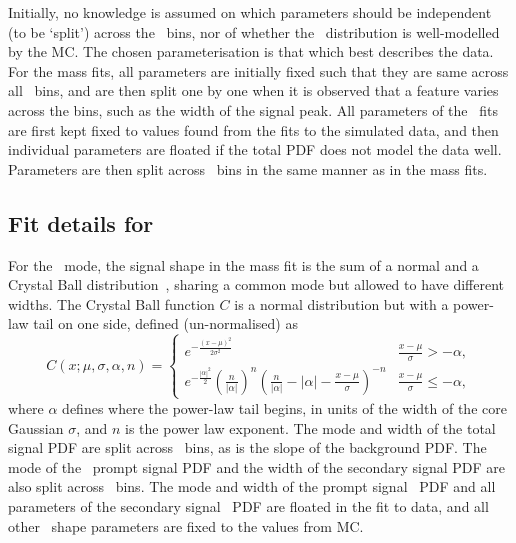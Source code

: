 Initially, no knowledge is assumed on which parameters should be independent 
(to be `split') across the \pTy\ bins, nor of whether the \lnipchisq\ 
distribution is well-modelled by the \ac{MC}.
The chosen parameterisation is that which best describes the data.
For the mass fits, all parameters are initially fixed such that they are same 
across all \pTy\ bins, and are then split one by one when it is observed that a 
feature varies across the bins, such as the width of the signal peak.
All parameters of the \lnipchisq\ fits are first kept fixed to values found 
from the fits to the simulated data, and then individual parameters are floated 
if the total PDF does not model the data well.
Parameters are then split across \pTy\ bins in the same manner as in the mass 
fits.

\subsection{Fit details for \PDzero}
\label{chap:prod:fitting:details:D0ToKpi}

For the \DzToKpi\ mode, the signal shape in the mass fit is the sum of a normal 
and a Crystal Ball distribution~\cite{Skwarnicki:1986xj}, sharing a common mode 
but allowed to have different widths.
The Crystal Ball function $C$ is a normal distribution but with a power-law 
tail on one side, defined (un-normalised) as
\begin{equation}
  C(x; \mu, \sigma, \alpha, n) = \begin{cases}
    e^{-\frac{{(x - \mu)}^{2}}{2\sigma^{2}}}                          & \frac{x - \mu}{\sigma} > -\alpha, \\
    e^{-\frac{|\alpha|^{2}}{2}}
      {\left(\frac{n}{|\alpha|}\right)}^{n}
      {\left(\frac{n}{|\alpha|} - |\alpha| - \frac{x - \mu}{\sigma}\right)}^{-n} & \frac{x - \mu}{\sigma} \leq -\alpha,
  \end{cases}
  \label{eqn:prod:fitting:crystal_ball}
\end{equation}
where $\alpha$ defines where the power-law tail begins, in units of the width 
of the core Gaussian $\sigma$, and $n$ is the power law exponent.
The mode and width of the total signal \ac{PDF} are split across \pTy\ bins, as 
is the slope of the background \ac{PDF}.
The mode of the \lnipchisq\ prompt signal \ac{PDF} and the width of the 
secondary signal \ac{PDF} are also split across \pTy\ bins.
The mode and width of the prompt signal \lnipchisq\ \ac{PDF} and all parameters 
of the secondary signal \lnipchisq\ \ac{PDF} are floated in the fit to data, 
and all other \lnipchisq\ shape parameters are fixed to the values from 
\ac{MC}.

